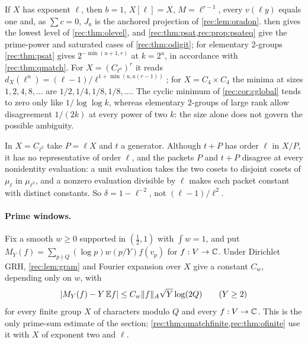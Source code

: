 \begin{remark}\label{rec:rem:pexp}
If $X$ has exponent $\ell$, then $b=1$, $X[\ell]=X$, $M=\ell^{r-1}$, every $v(\ell y)$ equals one and, as $\sum c=0$, $J_a$ is the
anchored projection of \cref{rec:lem:oradon}.  then gives the lowest level of \cref{rec:thm:olevel},
and \cref{rec:thm:psat,rec:prop:psateq} give the prime-power and saturated cases of \cref{rec:thm:odigit}; for elementary $2$-groups \cref{rec:thm:psat}
gives $2^{-\min(u+1,r)}$ at $k=2^u$, in accordance with \cref{rec:thm:qmatch}. For $X=(C_{\ell^a})^r$ it reads
$d_X(\ell^u)=(\ell-1)/\ell^{1+\min(u,a(r-1))}$; for $X=C_4\times C_4$ the minima at sizes $1,2,4,8,\dots$ are $1/2,1/4,1/8,1/8,\dots$.
The cyclic minimum of \cref{rec:cor:cglobal} tends to zero only like $1/\log\log k$, whereas elementary $2$-groups
of large rank allow disagreement $1/(2k)$ at every power of two $k$: the size alone does not govern the
possible ambiguity.
\end{remark}

\begin{example}\label{rec:ex:ctorsion}
In $X=C_{\ell^2}$ take $P=\ell X$ and $t$ a generator. Although $t+P$ has order $\ell$ in $X/P$, it has no representative
of order $\ell$, and the packets $P$ and $t+P$ disagree at every nonidentity evaluation: a unit evaluation takes
the two cosets to disjoint cosets of $\mu_\ell$ in $\mu_{\ell^2}$, and a nonzero evaluation divisible by $\ell$ makes each
packet constant with distinct constants. So $\delta=1-\ell^{-2}$, not $(\ell-1)/\ell^2$.
\end{example}

\paragraph{Prime windows.}
Fix a smooth $w\ge0$ supported in $(\tfrac12,1)$ with $\int w=1$, and put $M_Y(f)=\sum_{p\nmid Q}(\log p)w(p/Y)f(v_p)$ for
$f:V\to\mathbb{C}$. Under Dirichlet GRH, \cref{rec:lem:gram} and Fourier expansion over $X$ give a constant $C_w$, depending
only on $w$, with
\begin{equation}\label{rec:eq:cgram}
 \lvert M_Y(f)-Y\,\mathbb Ef\rvert\le C_w\lVert f\rVert_A\sqrt Y\log(2Q)\qquad(Y\ge2)
\end{equation}
for every finite group $X$ of characters modulo $Q$ and every $f:V\to\mathbb{C}$. This is the only prime-sum estimate of
the section; \cref{rec:thm:qmatchfinite,rec:thm:ofinite} use it with $X$ of exponent two and $\ell$.

